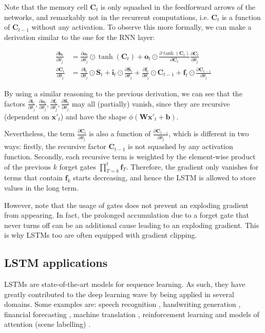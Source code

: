 \documentclass[pdftex,12pt,a4paper]{article}
\theoremstyle{definition}
\theoremstyle{remark}
\newcommand*{\V}[1]{\mathbf{#1}}%
\newcommand{\parder}[2]{\frac{\partial{#1}}{\partial{#2}}}
\begin{document}
\par Note that the memory cell $\V{C}_t$ is only squashed in the feedforward arrows of the networks, and remarkably not in the recurrent computations, i.e. $\V{C}_t$ is a function of $\V{C}_{t-1}$ without any activation. To observe this more formally, we can make a derivation similar to the one for the RNN layer:

\begin{align*}
    \parder{\V{h}_t}{\theta_j} &= \parder{\V{o}_t}{\theta_j}\odot \tanh(\V{C}_t) + \V{o}_t\odot\parder{\tanh(\V{C}_t)}{\V{C}_t}\parder{\V{C}_t}{\theta_j}\\
    \parder{\V{C}_t}{\theta_j} &= \parder{\V{i}_t}{\theta_j}\odot\V{S}_t +  \V{i}_t\odot\parder{\V{S}_t}{\theta_j} + \parder{\V{f}_t}{\theta_j}\odot\V{C}_{t-1} + \V{f}_t\odot\parder{\V{C}_{t-1}}{\theta_j}
\end{align*}

\par By using a similar reasoning to the previous derivation, we can see that the factors $\parder{\V{i}_t}{\theta_j}, \parder{\V{o}_t}{\theta_j}, \parder{\V{f}_t}{\theta_j}, \parder{\V{S}_t}{\theta_j}$ may all (partially) vanish, since they are recursive (dependent on $\V{x}'_t$) and have the shape $\phi(\V{Wx}'_t + \V{b})$. 

\par Nevertheless, the term $\parder{\V{C}_t}{\theta_j}$ is also a function of $\parder{\V{C}_{t-1}}{\theta_j}$, which is different in two ways: firstly, the recursive factor $\V{C}_{t-1}$ is not squashed by any activation function. Secondly, each recursive term is weighted by the element-wise product of the previous $k$ forget gates $\prod_{T=k}^t\V{f}_T$. Therefore, the gradient only vanishes for terms that contain $\V{f}_k$ starts decreasing, and hence the LSTM is allowed to store values in the long term.

\par However, note that the usage of gates does not prevent an exploding gradient from appearing. In fact, the prolonged accumulation due to a forget gate that never turns off can be an additional cause leading to an exploding gradient. This is why LSTMs too are often equipped with gradient clipping.

\subsection{LSTM applications} \label{sub_apps}
LSTMs are state-of-the-art models for sequence learning. As such, they have greatly contributed to the deep learning wave by being applied in several domains. Some examples are: speech recognition \cite{Graves2013}, handwriting generation \cite{Graves2013_2}, financial forecasting \cite{Rutkauskas2011}, machine translation \cite{Sutskever2014}, reinforcement learning \cite{Hausknecht2015} and models of attention (scene labelling) \cite{You2016,Long2014}. 
\end{document}
